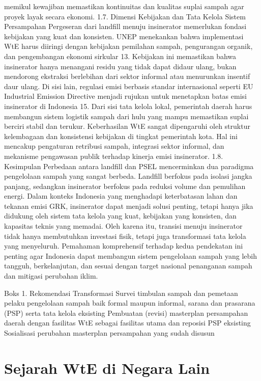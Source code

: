 \documentclass[
  letterpaper,
  DIV=11,
  numbers=noendperiod]{scrreprt}
\begin{document}
memikul kewajiban memastikan kontinuitas dan kualitas suplai sampah agar
proyek layak secara ekonomi. 1.7. Dimensi Kebijakan dan Tata Kelola
Sistem Persampahan Pergeseran dari landfill menuju insinerator
memerlukan fondasi kebijakan yang kuat dan konsisten. UNEP menekankan
bahwa implementasi WtE harus diiringi dengan kebijakan pemilahan sampah,
pengurangan organik, dan pengembangan ekonomi sirkular 13. Kebijakan ini
memastikan bahwa insinerator hanya menangani residu yang tidak dapat
didaur ulang, bukan mendorong ekstraksi berlebihan dari sektor informal
atau menurunkan insentif daur ulang. Di sisi lain, regulasi emisi
berbasis standar internasional seperti EU Industrial Emission Directive
menjadi rujukan untuk menetapkan batas emisi insinerator di Indonesia
15. Dari sisi tata kelola lokal, pemerintah daerah harus membangun
sistem logistik sampah dari hulu yang mampu memastikan suplai berciri
stabil dan terukur. Keberhasilan WtE sangat dipengaruhi oleh struktur
kelembagaan dan konsistensi kebijakan di tingkat pemerintah kota. Hal
ini mencakup pengaturan retribusi sampah, integrasi sektor informal, dan
mekanisme pengawasan publik terhadap kinerja emisi insinerator. 1.8.
Kesimpulan Perbedaan antara landfill dan PSEL mencerminkan dua paradigma
pengelolaan sampah yang sangat berbeda. Landfill berfokus pada isolasi
jangka panjang, sedangkan insinerator berfokus pada reduksi volume dan
pemulihan energi. Dalam konteks Indonesia yang menghadapi keterbatasan
lahan dan tekanan emisi GRK, insinerator dapat menjadi solusi penting,
tetapi hanya jika didukung oleh sistem tata kelola yang kuat, kebijakan
yang konsisten, dan kapasitas teknis yang memadai. Oleh karena itu,
transisi menuju insinerator tidak hanya membutuhkan investasi fisik,
tetapi juga transformasi tata kelola yang menyeluruh. Pemahaman
komprehensif terhadap kedua pendekatan ini penting agar Indonesia dapat
membangun sistem pengelolaan sampah yang lebih tangguh, berkelanjutan,
dan sesuai dengan target nasional penanganan sampah dan mitigasi
perubahan iklim.

Boks 1. Rekomendasi Transformasi Survei timbulan sampah dan pemetaan
pelaku pengelolaan sampah baik formal maupun informal, sarana dan
prasarana (PSP) serta tata kelola eksisting Pembuatan (revisi)
masterplan persampahan daerah dengan fasilitas WtE sebagai fasilitas
utama dan reposisi PSP eksisting Sosialisasi perubahan masterplan
persampahan yang sudah disusun


\chapter{Sejarah WtE di Negara Lain}\label{sejarah-wte-di-negara-lain}
\end{document}

